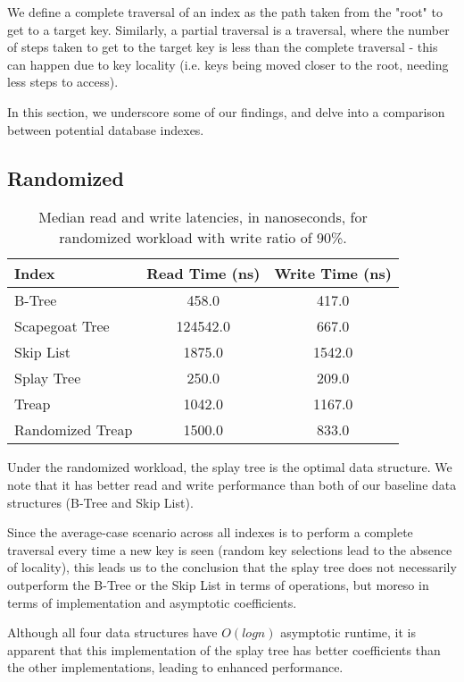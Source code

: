 \documentclass[sigconf]{acmart}
\begin{document}
We define a complete traversal of an index as the path taken from the "root" to get to a target  key. Similarly, a partial traversal is a traversal, where the number of steps taken to get to the target key is less than the complete traversal - this can happen due to key locality (i.e. keys being moved closer to the root, needing less steps to access).

In this section, we underscore some of our findings, and delve into a comparison between potential database indexes.

\subsection{Randomized}
\begin{center}
  \begin{table}[H]
    \begin{tabular}{|l|c|c|}
      \hline
      \bf{Index} & \bf{Read Time (ns)} & \bf{Write Time (ns)} \\
      \hline
      B-Tree&458.0&417.0\\
      \hline
      Scapegoat Tree&124542.0&667.0\\
      \hline
      Skip List&1875.0&1542.0\\
      \hline
      Splay Tree&250.0&209.0\\
      \hline
      Treap&1042.0&1167.0\\
      \hline
      Randomized Treap&1500.0&833.0\\
      \hline
    \end{tabular}
    \caption{Median read and write latencies, in nanoseconds, for randomized workload with write ratio of 90\%.}
  \end{table}
\end{center}

Under the randomized workload, the splay tree is the optimal data structure. We note that it has better read and write performance than both of our baseline data structures (B-Tree and Skip List). 

Since the average-case scenario across all indexes is to perform a complete traversal every time a new key is seen (random key selections lead to the absence of locality), this leads us to the conclusion that the splay tree does not necessarily outperform the B-Tree or the Skip List in terms of operations, but moreso in terms of implementation and asymptotic coefficients. 

Although all four data structures have $O(logn)$ asymptotic runtime, it is apparent that this implementation of the splay tree has better coefficients than the other implementations, leading to enhanced performance.
\end{document}
